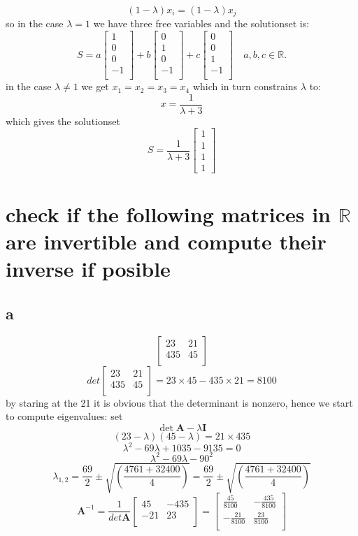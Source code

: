\documentclass[a4paper,10pt]{article}
\begin{document}
\[
(1-\lambda)x_i= (1-\lambda)x_j
\]
so in the case $\lambda=1$ we have three free variables and the solutionset is:
\[
S=
a\begin{bmatrix}
  1\\0\\0\\-1\\
 \end{bmatrix}
+b\begin{bmatrix}
   0\\1\\0\\-1\\
  \end{bmatrix}
 +c\begin{bmatrix}
    0\\0\\1\\-1\\
   \end{bmatrix}
\quad a,b,c\in \mathbb{R}.
\]
in the case $\lambda \neq 1$ we get $x_1=x_2=x_3=x_4$ which in turn constrains $\lambda$ to:
\[
x = \frac{1}{\lambda+3}
\]
 which gives the solutionset
 \[
 S= \frac{1}{\lambda+3}
 \begin{bmatrix}
  1\\1\\1\\1
 \end{bmatrix}
 \]
\section{check if the following matrices in $\mathbb{R}$ are invertible and compute their inverse if posible }
\subsection{a}
\[
\begin{bmatrix}
 23 & 21 \\
 435 & 45\\
\end{bmatrix}
\]
\[
det 
\begin{bmatrix}
 23 & 21 \\
 435 & 45\\
\end{bmatrix}
= 23\times45-435\times21= 8100
\]
by staring at the 21 it is obvious that the determinant is nonzero, hence we start to compute eigenvalues:
set \[\det \mathbf{A} -\lambda \mathbf{I}\]
\[
(23-\lambda)(45-\lambda)=21\times435
\]
\[
\lambda^2 -69\lambda + 1035 -9135=0
\]
\[
\lambda^2 -69\lambda - 90^2
\]
\[
\lambda_{1,2}= \frac{69}{2} \pm \sqrt{(\frac{4761+32400}{4})}= \frac{69}{2} \pm \sqrt{(\frac{4761+32400}{4})}
\]
\[
\mathbf{A}^{-1}= \frac{1}{det \mathbf{A}} 
\begin{bmatrix}
 45 & -435 \\
 -21 & 23\\
\end{bmatrix}
= \begin{bmatrix}
 \frac{45}{8100}  & -\frac{435}{8100} \\
 -\frac{21}{8100} & \frac{23}{8100}\\
\end{bmatrix}
\]
\end{document}
